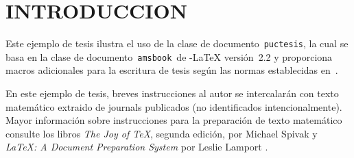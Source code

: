 \chapter{INTRODUCCION}\label{ch:introduction}
Este ejemplo de tesis ilustra el uso de la clase de documento \,\verb+puctesis+, la cual se basa en la clase de documento \,\verb+amsbook+\, de \AmS-\LaTeX{} versi\'on~2.2 y proporciona macros adicionales para la escritura de tesis seg\'un las normas establecidas en~\cite{SIBUC05}. 

En este ejemplo de tesis, breves instrucciones al autor se intercalar\'an con texto matem\'atico extraido de journals publicados (no identificados intencionalmente).  Mayor informaci\'on sobre instrucciones para la preparaci\'on de texto matem\'atico consulte los libros {\it The Joy of \TeX}, segunda edici\'on, por Michael Spivak \cite{SPI90} y {\it \LaTeX{}: A Document Preparation System} por Leslie Lamport \cite{LAM94}.